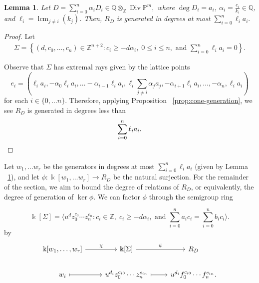\documentclass{amsart}
\theoremstyle{plain}
\newtheorem{lem}[thm]{Lemma}
\theoremstyle{definition}
\theoremstyle{remark}
\numberwithin{equation}{subsection}
\newcommand\bq{{\mathbb Q}}
\newcommand\bp{{\mathbb P}}
\newcommand\bz{{\mathbb Z}}
\newcommand\bk{{\Bbbk}}
\DeclareMathOperator\di{Div}
\newcommand\bida{a}
\newcommand\bidb{b}
\DeclareMathOperator{\lcm}{lcm}
\begin{document}
\begin{lem} \label{lem:proj-generators}
Let $D = \sum_{i=0}^{n} \alpha_i D_i \in \bq \otimes_\bz \di \bp^m,$ where
$\deg D_i = \bida_i$, $\alpha_i = \frac{c_i}{k_i}\in \bq$, and
$\ell_i = \lcm_{j \neq i} (k_j)$. Then, $R_D$ is generated in degrees at most $\sum_{i=0}^n \ell_i \bida_i.$
\end{lem}
\begin{proof}
Let 
\begin{align}\label{eqn:Sigma-defn}
	\Sigma = \left \{(d, c_0, \ldots, c_n) \in \bz^{n+2} \colon c_i \geq - d
\alpha_i, \; 0 \leq i \leq n, \text{ and } \sum_{i=0}^{n} \ell_i \bida_i = 0
\right \}.
\end{align}

Observe that $\Sigma$ has extremal rays given by the lattice points 
\begin{equation}\label{eqn:e-i-proj}
	e_i = \left(\ell_i \bida_i, - \alpha_0 \ell_i \bida_i, \ldots
-\alpha_{i-1} \ell_i \bida_i, \ell_i \sum_{j\ne i} \alpha_j \bida_j,
-\alpha_{i+1} \ell_i \bida_i, \ldots, -\alpha_n, \ell_i \bida_i \right)
\end{equation}
for each $i\in \{0, \ldots n\}$.
Therefore, applying Proposition ~\ref{prop:cone-generation}, we see $R_D$ is generated in degrees less than
\[
	\sum_{i=0}^n \ell_i \bida_i.
\qedhere
\]\end{proof}

Let $w_1, \ldots w_r$ be the generators in degrees at most $\sum_{i=0}^n \ell_i
\bida_i$ (given by Lemma ~\ref{lem:proj-generators}), and let 
$\phi \colon \bk[w_1, \ldots w_r] \to R_D$ be the natural surjection.
For the remainder of the section, we aim to bound the degree of relations
of $R_D$, or equivalently, the degree of generation of $\ker \phi$.
We can factor $\phi$ through the
semigroup ring 

\[
	\bk[\Sigma] =  \langle u^d z_0^{c_0} \cdots z_n^{c_n} \colon c_i \in
\bz, \; c_i \geq -d \alpha_i, \mbox{ and }\sum_{i=0}^{n} \bida_i c_i =
\sum_{i=0}^{n} \bidb_i c_i \rangle. 
\]
by
\begin{equation}
\label{eqn:factor-through-semigroup-ring}
\begin{tikzcd}[baseline=(current  bounding  box.center)]
\bk[w_1,\ldots, w_r] \ar {r}{\chi} & \bk[\Sigma] \ar {r}{\psi} & R_D \\
w_i \ar[mapsto]{r} & u^{d_i}z_0^{c_{i0}} \cdots z_n^{c_{in}} \ar[mapsto]{r} & u^{d_i}f_0^{c_{i0}} \cdots f_n^{c_{in}}.
\end{tikzcd}
\end{equation}
\end{document}

